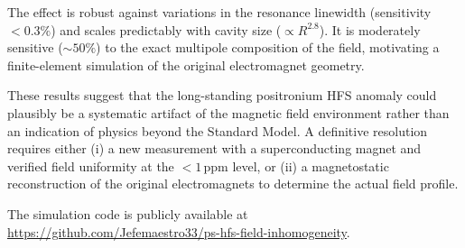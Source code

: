 \documentclass[twocolumn,pra,aps,superscriptaddress,floatfix,10pt]{revtex4-2}
\begin{document}
The effect is robust against variations in the resonance linewidth (sensitivity $< 0.3\%$) and scales predictably with cavity size ($\propto R^{2.8}$). It is moderately sensitive ($\sim 50\%$) to the exact multipole composition of the field, motivating a finite-element simulation of the original electromagnet geometry.

These results suggest that the long-standing positronium HFS anomaly could plausibly be a systematic artifact of the magnetic field environment rather than an indication of physics beyond the Standard Model. A definitive resolution requires either (i) a new measurement with a superconducting magnet and verified field uniformity at the $< 1$\,ppm level, or (ii) a magnetostatic reconstruction of the original electromagnets to determine the actual field profile.

\begin{acknowledgments}
The simulation code is publicly available at \url{https://github.com/Jefemaestro33/ps-hfs-field-inhomogeneity}.
\end{acknowledgments}


\end{document}
